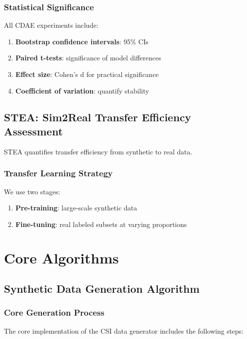 \subsubsection{Statistical Significance}
All CDAE experiments include:

\begin{enumerate}
\item \textbf{Bootstrap confidence intervals}: 95\% CIs
\item \textbf{Paired t-tests}: significance of model differences
\item \textbf{Effect size}: Cohen's d for practical significance
\item \textbf{Coefficient of variation}: quantify stability
\end{enumerate}

\subsection{STEA: Sim2Real Transfer Efficiency Assessment}
\label{subsec:stea_protocol}

STEA quantifies transfer efficiency from synthetic to real data.

\subsubsection{Transfer Learning Strategy}
We use two stages:

\begin{enumerate}
\item \textbf{Pre-training}: large-scale synthetic data
\item \textbf{Fine-tuning}: real labeled subsets at varying proportions
\end{enumerate}

\section{Core Algorithms}
\label{sec:algorithms}

\subsection{Synthetic Data Generation Algorithm}
\label{subsec:synthetic_generation}

\subsubsection{Core Generation Process}
The core implementation of the CSI data generator includes the following steps:

